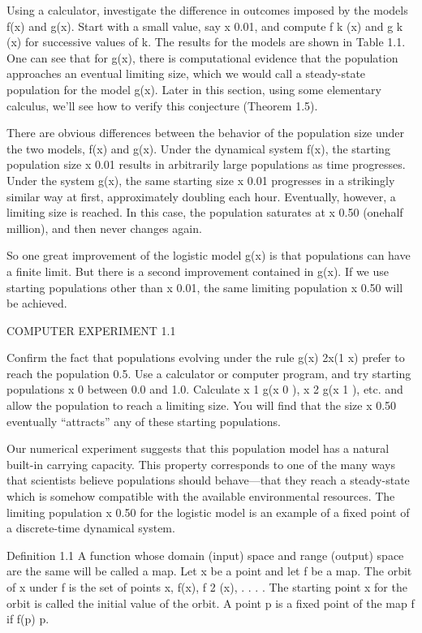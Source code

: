 \documentclass[12pt]{article}
\begin{document}
Using a calculator, investigate the difference in outcomes imposed by the models f(x) and g(x). Start with 
a small value, say x  0.01, and compute f k (x) and g k (x) for successive values of k. The results for the 
models are shown in Table 1.1. One can see that for g(x), there is computational evidence that the 
population approaches an eventual limiting size, which we would call a steady-state population for the 
model g(x). Later in this section, using some elementary calculus, we’ll see how to verify this conjecture 
(Theorem 1.5).

There are obvious differences between the behavior of the population size under the two models, f(x) and 
g(x). Under the dynamical system f(x), the starting population size x  0.01 results in arbitrarily large 
populations as time progresses. Under the system g(x), the same starting size x  0.01 progresses in a 
strikingly similar way at ﬁrst, approximately doubling each hour. Eventually, however, a limiting size is 
reached. In this case, the population saturates at x  0.50 (onehalf million), and then never changes again.

So one great improvement of the logistic model g(x) is that populations can have a ﬁnite limit. But there 
is a second improvement contained in g(x). If we use starting populations other than x  0.01, the same 
limiting population x  0.50 will be achieved.

COMPUTER EXPERIMENT 1.1

Conﬁrm the fact that populations evolving under the rule g(x)  2x(1  x) prefer to reach the population 
0.5. Use a calculator or computer program, and try starting populations x 0 between 0.0 and 1.0. Calculate 
x 1  g(x 0 ), x 2  g(x 1 ), etc. and allow the population to reach a limiting size. You will ﬁnd that the 
size x  0.50 eventually “attracts” any of these starting populations.

Our numerical experiment suggests that this population model has a natural built-in carrying capacity. This 
property corresponds to one of the many ways that scientists believe populations should behave—that they 
reach a steady-state which is somehow compatible with the available environmental resources. The limiting 
population x  0.50 for the logistic model is an example of a ﬁxed point of a discrete-time dynamical 
system.

Deﬁnition 1.1 A function whose domain (input) space and range (output) space are the same will be called a 
map. Let x be a point and let f be a map. The orbit of x under f is the set of points x, f(x), f 2 (x), . . 
.  . The starting point x for the orbit is called the initial value of the orbit. A point p is a ﬁxed 
point of the map f if f(p)  p.
\end{document}
